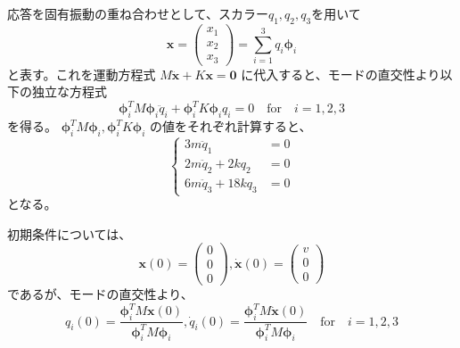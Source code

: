 \documentclass[a4paper]{jsarticle}
\begin{document}
\subsection{}
応答を固有振動の重ね合わせとして、スカラー$q_1, q_2, q_3$を用いて
\begin{equation}
  \boldsymbol{x} =
  \begin{pmatrix}
    x_1 \\ x_2 \\ x_3
  \end{pmatrix} =
  \sum_{i = 1}^3 q_i \boldsymbol{\phi}_i
\end{equation}
と表す。これを運動方程式
$M \ddot{\boldsymbol{x}} + K \boldsymbol{x} = \boldsymbol{0}$
に代入すると、モードの直交性より以下の独立な方程式
\begin{equation}
  \boldsymbol{\phi}_i^T M \boldsymbol{\phi}_i \ddot{q}_i +
  \boldsymbol{\phi}_i^T K \boldsymbol{\phi}_i q_i = 0
  \quad \mathrm{for} \quad i = 1, 2, 3
\end{equation}
を得る。
$\boldsymbol{\phi}_i^T M \boldsymbol{\phi}_i, \boldsymbol{\phi}_i^T K \boldsymbol{\phi}_i$
の値をそれぞれ計算すると、
\begin{equation}
  \begin{cases}
    3 m \ddot{q}_1            & = 0 \\
    2 m \ddot{q}_2 + 2 k q_2  & = 0 \\
    6 m \ddot{q}_3 + 18 k q_3 & = 0
  \end{cases}
\end{equation}
となる。\par
初期条件については、
\begin{equation}
  \boldsymbol{x}(0) =
  \begin{pmatrix}
    0 \\ 0 \\ 0
  \end{pmatrix},
  \boldsymbol{\dot{x}}(0) =
  \begin{pmatrix}
    v \\ 0 \\ 0
  \end{pmatrix}
\end{equation}
であるが、モードの直交性より、
\begin{equation}
  q_i(0) = \frac{\boldsymbol{\phi}_i^T M \boldsymbol{x}(0)}{\boldsymbol{\phi}_i^T M \boldsymbol{\phi}_i},
  \dot{q}_i(0) = \frac{\boldsymbol{\phi}_i^T M \boldsymbol{\dot{x}}(0)}{\boldsymbol{\phi}_i^T M \boldsymbol{\phi}_i}
  \quad \mathrm{for} \quad i = 1, 2, 3
\end{equation}
\end{document}
